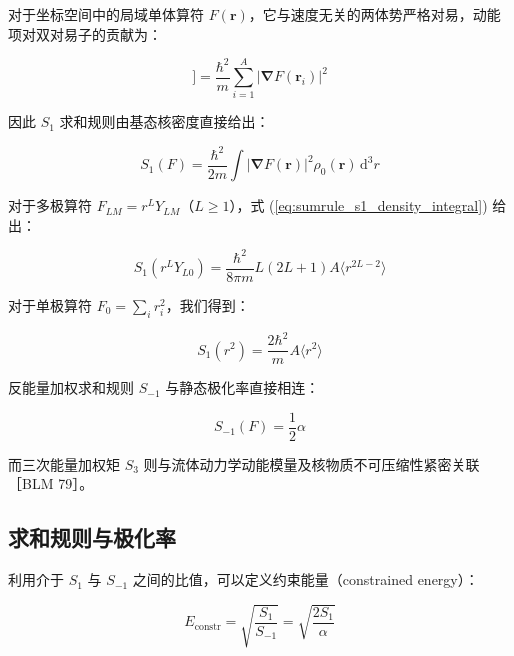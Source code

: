对于坐标空间中的局域单体算符 $F(\boldsymbol{r})$，它与速度无关的两体势严格对易，动能项对双对易子的贡献为：

\begin{equation}
[F,[H,F]]=\frac{\hbar^{2}}{m}\sum^{A}_{i=1}|\boldsymbol{\nabla}F(\boldsymbol{r}_{i})|^{2}\label{eq:sumrule_kinetic_double_commutator}
\end{equation}

因此 $S_{1}$ 求和规则由基态核密度直接给出：

\begin{equation}
S_{1}(F)=\frac{\hbar^{2}}{2m}\int|\boldsymbol{\nabla}F(\boldsymbol{r})|^{2}\rho_{0}(\boldsymbol{r})\,\mathrm{d}^{3}r\label{eq:sumrule_s1_density_integral}
\end{equation}

对于多极算符 $F_{LM}=r^{L}Y_{LM}$（$L\ge1$），式 (\ref{eq:sumrule_s1_density_integral})
给出：

\begin{equation}
S_{1}(r^{L}Y_{L0})=\frac{\hbar^{2}}{8\pi m}L(2L+1)A\langle r^{2L-2}\rangle\label{eq:sumrule_multipole_ewsr}
\end{equation}

对于单极算符 $F_{0}=\sum_{i}r^{2}_{i}$，我们得到：

\begin{equation}
S_{1}(r^{2})=\frac{2\hbar^{2}}{m}A\langle r^{2}\rangle\label{eq:sumrule_monopole_ewsr}
\end{equation}

反能量加权求和规则 $S_{-1}$ 与静态极化率直接相连：

\begin{equation}
S_{-1}(F)=\frac{1}{2}\alpha\label{eq:sumrule_sminus1_polarizability}
\end{equation}

而三次能量加权矩 $S_{3}$ 则与流体动力学动能模量及核物质不可压缩性紧密关联［BLM 79］。

\subsection{求和规则与极化率\label{subsec:8.7.4_=006C42=00548C=0089C4=005219=004E0E=006781=005316=007387}}

利用介于 $S_{1}$ 与 $S_{-1}$ 之间的比值，可以定义约束能量（constrained energy）：

\begin{equation}
E_{\text{constr}}=\sqrt{\frac{S_{1}}{S_{-1}}}=\sqrt{\frac{2S_{1}}{\alpha}}\label{eq:sumrule_constrained_energy}
\end{equation}

